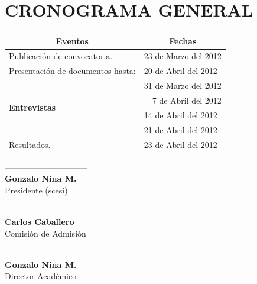 \documentclass[11pt,letterpaper]{article}
\begin{document}
\section*{\bf \normalsize CRONOGRAMA GENERAL}
\begin{center}
\begin{tabular}{|l|l|}
\hline
\multicolumn{1}{|c|}{\bf  Eventos} & \multicolumn{1}{c|}{\bf Fechas}\\
\hline
Publicación de convocatoria. & 23 de Marzo del 2012\\
\hline
Presentación de documentos hasta: & 20 de Abril del 2012\\
\hline
\multirow{4}{*}{\bf Entrevistas} & 31 de Marzo del 2012 \\
\cline{2-2}
& ~~7 de Abril del 2012\\
\cline{2-2}
& 14 de Abril del 2012\\
\cline{2-2}
& 21 de Abril del 2012\\
\hline
Resultados. & 23 de Abril del 2012\\
\hline
\end{tabular}
\end{center}
 \vspace{2.3cm}
\begin{minipage}{0.25\textwidth}
\begin{center}
------------------------------\\
{\bf Gonzalo Nina M.}\\
Presidente (scesi)\\
\end{center}
\end{minipage}
\begin{minipage}{0.47\textwidth}
\begin{center}
------------------------------\\
{\bf Carlos Caballero}\\
Comisión de Admisión
\end{center}
\end{minipage}
\begin{minipage}{0.28\textwidth}

\begin{center}
------------------------------\\
{\bf Gonzalo Nina M.}\\
Director Académico\\
\end{center}
\end{minipage}
\end{document}
